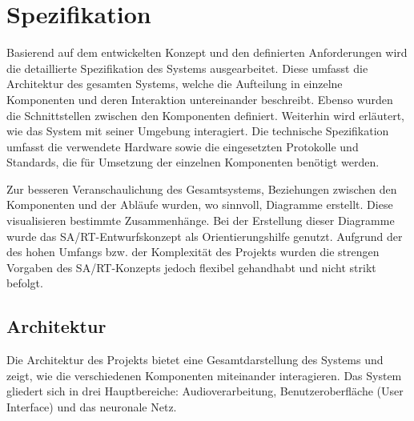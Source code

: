 \newpage
\section{Spezifikation}
Basierend auf dem entwickelten Konzept und den definierten Anforderungen wird die detaillierte Spezifikation des Systems ausgearbeitet. Diese umfasst die Architektur des gesamten Systems, welche die Aufteilung in einzelne Komponenten und deren Interaktion untereinander beschreibt. Ebenso wurden die Schnittstellen zwischen den Komponenten definiert. Weiterhin wird erläutert, wie das System mit seiner Umgebung interagiert. Die technische Spezifikation umfasst die verwendete Hardware sowie die eingesetzten Protokolle und Standards, die für Umsetzung der einzelnen Komponenten benötigt werden. 

Zur besseren Veranschaulichung des Gesamtsystems, Beziehungen zwischen den Komponenten und der Abläufe wurden, wo sinnvoll, Diagramme erstellt. Diese visualisieren bestimmte Zusammenhänge. Bei der Erstellung dieser Diagramme wurde das SA/RT-Entwurfskonzept als Orientierungshilfe genutzt. Aufgrund der des hohen Umfangs bzw. der Komplexität des Projekts wurden die strengen Vorgaben des SA/RT-Konzepts jedoch flexibel gehandhabt und nicht strikt befolgt.

\subsection{Architektur}
Die Architektur des Projekts bietet eine Gesamtdarstellung des Systems und zeigt, wie die verschiedenen Komponenten miteinander interagieren. Das System gliedert sich in drei Hauptbereiche: Audioverarbeitung, Benutzeroberfläche (User Interface) und das neuronale Netz.

